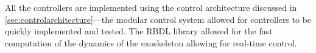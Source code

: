 All the controllers are implemented using the control architecture discussed in \autoref{sec:controlarchitecture}—the modular control system allowed for controllers to be quickly implemented and tested. The RBDL library allowed for the fast computation of the dynamics of the exoskeleton allowing for real-time control. 




